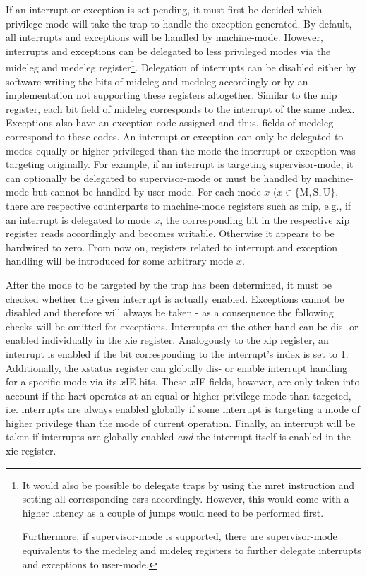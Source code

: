 If an interrupt or exception is set pending, it must first be decided which privilege mode will take the trap to handle the exception generated.
By default, all interrupts and exceptions will be handled by machine-mode.
However, interrupts and exceptions can be delegated to less privileged modes via the \gls{mideleg} and \gls{medeleg} register\footnote{%
    It would also be possible to delegate traps by using the \gls{mret} instruction and setting all corresponding \glspl{csr} accordingly.
    However, this would come with a higher latency as a couple of jumps would need to be performed first.

    Furthermore, if supervisor-mode is supported, there are supervisor-mode equivalents to the \gls{medeleg} and \gls{mideleg} registers to further delegate interrupts and exceptions to user-mode.
}.
Delegation of interrupts can be disabled either by software writing the bits of \gls{mideleg} and \gls{medeleg} accordingly or by an implementation not supporting these registers altogether.
Similar to the \gls{mip} register, each bit field of \gls{mideleg} corresponds to the interrupt of the same index.
Exceptions also have an exception code assigned and thus, fields of \gls{medeleg} correspond to these codes.
An interrupt or exception can only be delegated to modes equally or higher privileged than the mode the interrupt or exception was targeting originally.
For example, if an interrupt is targeting supervisor-mode, it can optionally be delegated to supervisor-mode or must be handled by machine-mode but cannot be handled by user-mode.
For each mode $ x $ ($ x \in \{ \text{M}, \text{S}, \text{U}\} $, there are respective counterparts to machine-mode registers such as \gls{mip}, e.g., if an interrupt is delegated to mode $ x $, the corresponding bit in the respective \gls{xip} register reads accordingly and becomes writable.
Otherwise it appears to be hardwired to zero.
From now on, registers related to interrupt and exception handling will be introduced for some arbitrary mode $ x $.

After the mode to be targeted by the trap has been determined, it must be checked whether the given interrupt is actually enabled.
Exceptions cannot be disabled and therefore will always be taken - as a consequence the following checks will be omitted for exceptions.
Interrupts on the other hand can be dis- or enabled individually in the \gls{xie} register.
Analogously to the \gls{xip} register, an interrupt is enabled if the bit corresponding to the interrupt's index is set to 1.
Additionally, the \gls{xstatus} register can globally dis- or enable interrupt handling for a specific mode via its $x$IE bits.
These $x$IE fields, however, are only taken into account if the \gls{hart} operates at an equal or higher privilege mode than targeted, i.e. interrupts are always enabled globally if some interrupt is targeting a mode of higher privilege than the mode of current operation.
Finally, an interrupt will be taken if interrupts are globally enabled \textit{and} the interrupt itself is enabled in the \gls{xie} register.

